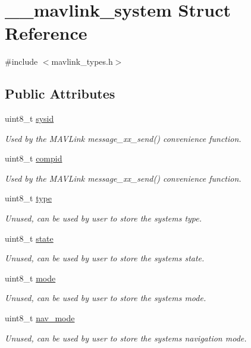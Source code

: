 \hypertarget{struct____mavlink__system}{}\section{\+\_\+\+\_\+mavlink\+\_\+system Struct Reference}
\label{struct____mavlink__system}


{\ttfamily \#include $<$mavlink\+\_\+types.\+h$>$}

\subsection*{Public Attributes}
\begin{DoxyCompactItemize}
\item 
uint8\+\_\+t \mbox{\hyperlink{struct____mavlink__system_a3533dcc52fcacb13bb3190ae847e8260}{sysid}}
\begin{DoxyCompactList}\small\item\em Used by the M\+A\+V\+Link message\+\_\+xx\+\_\+send() convenience function. \end{DoxyCompactList}\item 
uint8\+\_\+t \mbox{\hyperlink{struct____mavlink__system_a1aec3b4f214beea3276a214c7498cb0f}{compid}}
\begin{DoxyCompactList}\small\item\em Used by the M\+A\+V\+Link message\+\_\+xx\+\_\+send() convenience function. \end{DoxyCompactList}\item 
uint8\+\_\+t \mbox{\hyperlink{struct____mavlink__system_aab94b93e251cac8de298a0ff90c41b8f}{type}}
\begin{DoxyCompactList}\small\item\em Unused, can be used by user to store the system\textquotesingle{}s type. \end{DoxyCompactList}\item 
uint8\+\_\+t \mbox{\hyperlink{struct____mavlink__system_ac5afa4a95067ba7b21d4884a740cc413}{state}}
\begin{DoxyCompactList}\small\item\em Unused, can be used by user to store the system\textquotesingle{}s state. \end{DoxyCompactList}\item 
uint8\+\_\+t \mbox{\hyperlink{struct____mavlink__system_a4bd3edea462570856b5575eecafd2b6d}{mode}}
\begin{DoxyCompactList}\small\item\em Unused, can be used by user to store the system\textquotesingle{}s mode. \end{DoxyCompactList}\item 
uint8\+\_\+t \mbox{\hyperlink{struct____mavlink__system_ae653c03239304982024c03ac165c5011}{nav\+\_\+mode}}
\begin{DoxyCompactList}\small\item\em Unused, can be used by user to store the system\textquotesingle{}s navigation mode. \end{DoxyCompactList}\end{DoxyCompactItemize}



